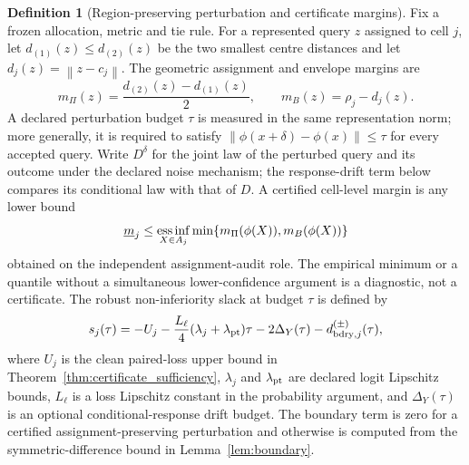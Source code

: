 \documentclass[11pt,a4paper]{article}
\newcommand{\norm}[1]{\left\lVert#1\right\rVert}
\numberwithin{equation}{section}
\theoremstyle{definition}\newtheorem{definition}[theorem]{Definition}
\theoremstyle{remark}\newtheorem{remark}[theorem]{Remark}
\begin{document}
\begin{definition}[Region-preserving perturbation and certificate margins]\label{def:perturbation_margin}
Fix a frozen allocation, metric and tie rule.  For a represented query $z$ assigned to
cell $j$, let $d_{(1)}(z)\le d_{(2)}(z)$ be the two smallest centre distances and
let $d_j(z)=\norm{z-c_j}$.  The geometric assignment and envelope margins are
\[
 m_{\Pi}(z)=\frac{d_{(2)}(z)-d_{(1)}(z)}{2},\qquad
 m_{B}(z)=\rho_j-d_j(z).
\]
A declared perturbation budget $\tau$ is measured in the same representation norm;
more generally, it is required to satisfy
$\norm{\phi(x+\delta)-\phi(x)}\le\tau$ for every accepted query.  Write $D^\delta$ for
the joint law of the perturbed query and its outcome under the declared noise
mechanism; the response-drift term below compares its conditional law with that
of $D$.  A certified cell-level margin is any lower bound
\[
 \underline m_j\le \mathop{\rm ess\,inf}_{X\in A_j}
       \min\{m_{\Pi}(\phi(X)),m_B(\phi(X))\}
\]
obtained on the independent assignment-audit role.  The empirical minimum or a
quantile without a simultaneous lower-confidence argument is a diagnostic, not a
certificate.  The robust non-inferiority slack at budget $\tau$ is defined by
\[
 s_j(\tau)=-U_j-
 \frac{L_{\ell}}{4}(\lambda_j+\lambda_{\rm pt})\tau
 -2\Delta_Y(\tau)-d^{(\pm)}_{{\rm bdry},j}(\tau),
\]
where $U_j$ is the clean paired-loss upper bound in Theorem~\ref{thm:certificate_sufficiency},
$\lambda_j$ and $\lambda_{\rm pt}$ are declared logit Lipschitz bounds,
$L_{\ell}$ is a loss Lipschitz constant in the probability argument, and
$\Delta_Y(\tau)$ is an optional conditional-response drift budget.  The boundary
term is zero for a certified assignment-preserving perturbation and otherwise is
computed from the symmetric-difference bound in Lemma~\ref{lem:boundary}.
\end{definition}
\end{document}
